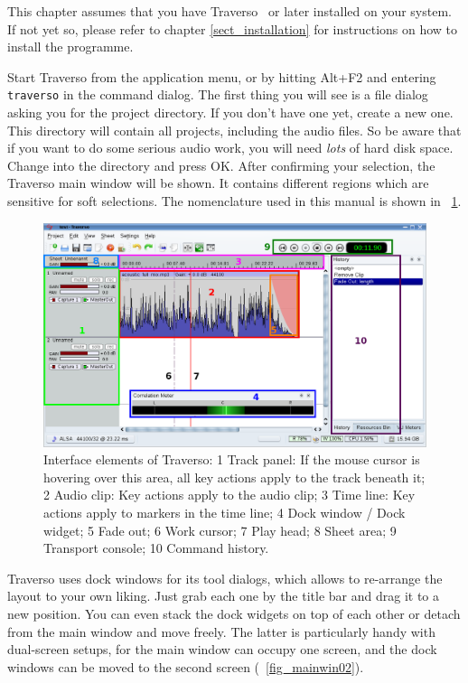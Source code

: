 This chapter assumes that you have Traverso \Version\ or later installed on your system. If not yet so, please refer to chapter \ref{sect_installation} for instructions on how to install the programme.

Start Traverso from the application menu, or by hitting Alt+F2 and entering \texttt{traverso} in the command dialog. The first thing you will see is a file dialog asking you for the project directory. If you don't have one yet, create a new one. This directory will contain all projects, including the audio files. So be aware that if you want to do some serious audio work, you will need \emph{lots} of hard disk space. Change into the directory and press OK. After confirming your selection, the Traverso main window will be shown. It contains different regions which are sensitive for soft selections. The nomenclature used in this manual is shown in \FigT\ \ref{fig_gui01}.

\begin{figure}
 \centering\includegraphics[width=\textwidth]{../images/sshot06.png}
 \caption{Interface elements of Traverso: 1 Track panel: If the mouse cursor is hovering over this area, all key actions apply to the track beneath it; 2 Audio clip: Key actions apply to the audio clip; 3 Time line: Key actions apply to markers in the time line; 4 Dock window / Dock widget; 5 Fade out; 6 Work cursor; 7 Play head; 8 Sheet area; 9 Transport console; 10 Command history.}
 \label{fig_gui01}
\end{figure}

Traverso uses dock windows for its tool dialogs, which allows to re-arrange the layout to your own liking. Just grab each one by the title bar and drag it to a new position. You can even stack the dock widgets on top of each other or detach from the main window and move freely. The latter is particularly handy with dual-screen setups, for the main window can occupy one screen, and the dock windows can be moved to the second screen (\FigB\ \ref{fig_mainwin02}).

